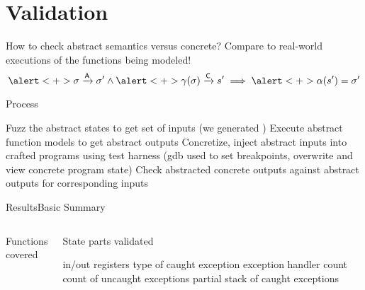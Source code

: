 \section{Validation}
\begin{frame}{How to check abstract semantics versus concrete?}
  \centering
  Compare to \alert<+>{real-world} executions of the functions being modeled!
  \vfill
  \begin{equation}
    \alert<+>{\sigma\absTransition\sigma'}
    \land
    \alert<+>{\gamma(\sigma)\concTransition s'}
    \implies
    \alert<+>{\alpha(s')=\sigma'}
    \label{eq:validation}
  \end{equation}
  \vfill
\end{frame}

\begin{frame}{Process}
  \begin{outline}[enumerate]
    \1<+-> \alert{Fuzz} the \alert{abstract} states to get set of \alert{inputs} (we generated )
    \1<+-> Execute abstract function models to get abstract \alert{outputs}
    \1<+-> \alert{Concretize}, inject abstract inputs into crafted programs using \alert{test harness} (\gls{gdb} used to set breakpoints, overwrite and view concrete program state)
    \1<+-> Check \alert{abstracted} \alert{concrete} outputs against abstract outputs for corresponding inputs
  \end{outline}
\end{frame}

\begin{frame}{Results}{Basic Summary}
  \begin{columns}
    \begin{block}{Functions covered}
      \begin{outline}
        \1 
        \1 
        \1 
        \1 
        \1 
      \end{outline}
    \end{block}
    \pause
    \begin{block}{State parts validated}
      \begin{outline}
        \1 in/out registers
        \1 type of caught exception
        \1 exception handler count
        \1 count of uncaught exceptions
        \1 partial stack of caught exceptions
      \end{outline}
    \end{block}
  \end{columns}
\end{frame}

